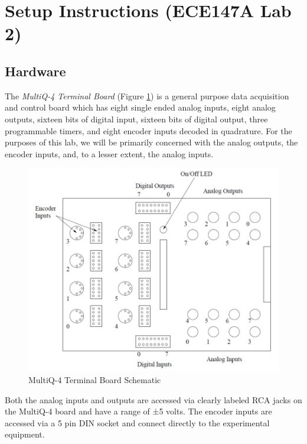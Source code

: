 \documentclass[11pt,letterpaper]{article}
\begin{document}
\newpage
\section{Setup Instructions (ECE147A Lab 2)}
\subsection{Hardware}\label{subsec:hardware}
The \textit{MultiQ-4 Terminal Board} (Figure \ref{fig:q4_DAQ}) is a general purpose data acquisition and control board which has eight single ended analog inputs, eight analog outputs, sixteen bits of digital input, sixteen bits of digital output, three programmable timers, and eight encoder inputs decoded in quadrature. For the purposes of this lab, we will be primarily concerned with the analog outputs, the encoder inputs, and, to a lesser extent, the analog inputs.
\begin{figure}[H]
  \centering 
  \includegraphics[width=1\textwidth]{Figures/q4_daq.png}
  \caption{MultiQ-4 Terminal Board Schematic}
  \label{fig:q4_DAQ}
\end{figure}
\noindent Both the analog inputs and outputs are accessed via clearly labeled RCA jacks on the MultiQ-4 board and have a range of ±5 volts. The encoder inputs are accessed via a 5 pin DIN socket and connect directly to the experimental equipment.

\newpage
\end{document}
